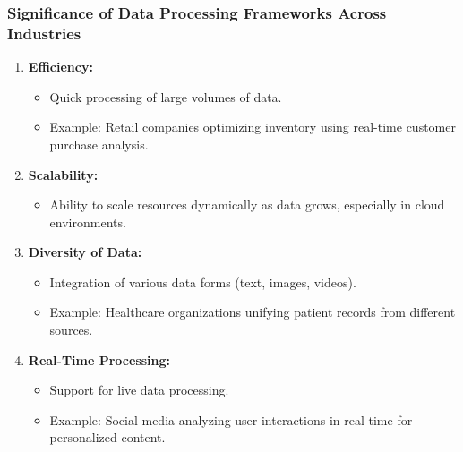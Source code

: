 \documentclass[aspectratio=169]{beamer}
\begin{document}
\begin{frame}[fragile]
    \frametitle{Significance of Data Processing Frameworks Across Industries}

    \begin{enumerate}
        \item \textbf{Efficiency:}
        \begin{itemize}
            \item Quick processing of large volumes of data.
            \item Example: Retail companies optimizing inventory using real-time customer purchase analysis.
        \end{itemize}
        
        \item \textbf{Scalability:}
        \begin{itemize}
            \item Ability to scale resources dynamically as data grows, especially in cloud environments.
        \end{itemize}
        
        \item \textbf{Diversity of Data:}
        \begin{itemize}
            \item Integration of various data forms (text, images, videos).
            \item Example: Healthcare organizations unifying patient records from different sources.
        \end{itemize}
        
        \item \textbf{Real-Time Processing:}
        \begin{itemize}
            \item Support for live data processing.
            \item Example: Social media analyzing user interactions in real-time for personalized content.
        \end{itemize}
    \end{enumerate}
\end{frame}
\end{document}
